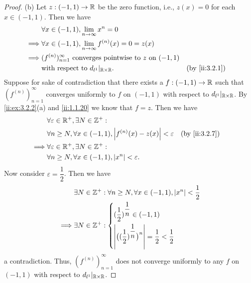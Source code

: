 \begin{proof}{(b)}
  Let \(z : (-1, 1) \to \mathbb{R}\) be the zero function, i.e., \(z(x) = 0\) for each \(x \in (-1, 1)\).
  Then we have
  \begin{align*}
             & \forall x \in (-1, 1), \lim_{n \to \infty} x^n = 0                                                \\
    \implies & \forall x \in (-1, 1), \lim_{n \to \infty} f^{(n)}(x) = 0 = z(x)                                  \\
    \implies & (f^{(n)})_{n = 1}^\infty \text{ converges pointwise to } z \text{ on } (-1, 1)                    \\
             & \text{with respect to } d_{l^1}|_{\R \times \R}.                               &  & \by{ii:3.2.1}
  \end{align*}
  Suppose for sake of contradiction that there exists a \(f : (-1, 1) \to \mathbb{R}\) such that \((f^{(n)})_{n = 1}^\infty\) converges uniformly to \(f\) on \((-1, 1)\) with respect to \(d_{l^1}|_{\mathbb{R} \times \mathbb{R}}\).
  By \cref{ii:ex:3.2.2}(a) and \cref{ii:1.1.20} we know that \(f = z\).
  Then we have
  \begin{align*}
             & \forall \varepsilon \in \R^+, \exists N \in \Z^+ :                                                \\
             & \forall n \geq N, \forall x \in (-1, 1), \abs{f^{(n)}(x) - z(x)} < \varepsilon &  & \by{ii:3.2.7} \\
    \implies & \forall \varepsilon \in \R^+, \exists N \in \Z^+ :                                                \\
             & \forall n \geq N, \forall x \in (-1, 1), \abs{x^n} < \varepsilon.
  \end{align*}
  Now consider \(\varepsilon = \dfrac{1}{2}\).
  Then we have
  \begin{align*}
             & \exists N \in \mathbb{Z}^+ : \forall n \geq N, \forall x \in (-1, 1), \left\lvert x^n\right\rvert < \dfrac{1}{2}                                               \\
    \implies & \exists N \in \mathbb{Z}^+ : \begin{dcases}
                                      (\dfrac{1}{2})^{\dfrac{1}{n}} \in (-1, 1) \\
                                      \left\lvert\big((\dfrac{1}{2})^{\dfrac{1}{n}}\big)^n\right\rvert = \dfrac{1}{2} < \dfrac{1}{2}
                                    \end{dcases}
  \end{align*}
  a contradiction.
  Thus, \((f^{(n)})_{n = 1}^\infty\) does not converge uniformly to any \(f\) on \((-1, 1)\) with respect to \(d_{l^1}|_{\mathbb{R} \times \mathbb{R}}\).
\end{proof}

